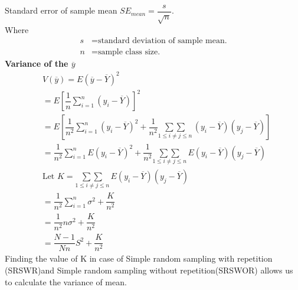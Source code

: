 \documentclass[journal,12pt,twocolumn]{IEEEtran}
\begin{document}
Standard error of sample mean $SE_{mean}=\dfrac{s}{\sqrt{n}}$.\\
Where 
\begin{align*}
s & = \text{standard deviation of sample mean.}\\
n & = \text{sample class size.}
\end{align*}
\textbf{Variance of the $\overline{y}$}
\begin{align}
& V(\overline{y})= E(\overline{y}-\overline{Y})^2\\
& = E\left[\dfrac{1}{n} \sum_{i=1}^{n}(y_i-\overline{Y})\right]^2\\
& = E\left[\dfrac{1}{n^2} \sum_{i=1}^{n} (y_i-\overline{Y})^2 + \dfrac{1}{n^2} \underset{1\leq i\neq j\leq n}{\sum\sum}\, (y_i-\overline{Y})(y_j-\overline{Y})\right]\\
& = \dfrac{1}{n^2}\sum_{i=1}^{n} E(y_i-\overline{Y})^2+\dfrac{1}{n^2} \underset{1\leq i\neq j\leq n}{\sum\sum}\, E(y_i-\overline{Y})(y_j-\overline{Y})\\
& \text{Let } K=\underset{1\leq i\neq j\leq n}{\sum\sum}\, E(y_i-\overline{Y})(y_j-\overline{Y})\\
& = \dfrac{1}{n^2}\sum_{i=1}^{n} \sigma^2 + \dfrac{K}{n^2}\\
& = \dfrac{1}{n^2} n \sigma^2 +\dfrac{K}{n^2}\\
& = \dfrac{N-1}{Nn} S^2+\dfrac{K}{n^2}\label{eq_1}
\end{align}
Finding the value of K in case of Simple random sampling with repetition (SRSWR)and Simple random sampling without repetition(SRSWOR) allows us to calculate the variance of mean.
\end{document}
